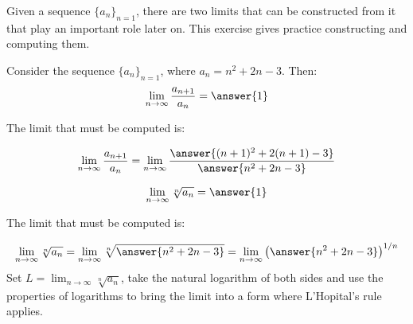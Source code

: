 \documentclass{ximera}
\author{Jim Talamo}
\begin{document}
\begin{exercise}

Given a sequence $\{a_n\}_{n=1}$, there are two limits that can be constructed from it that play an important role later on.  This exercise gives practice constructing and computing them.

Consider the sequence $\{a_n \}_{n=1}$, where $a_n =n^2+2n-3$.  Then:
\[
\lim_{n \to \infty} \frac{a_{n+1}}{a_n} = \answer{1}
\]

\begin{hint}
The limit that must be computed is:

\[
\lim_{n \to \infty} \frac{a_{n+1}}{a_n} = \lim_{n \to \infty} \frac{\answer{(n+1)^2+2(n+1)-3}}{\answer{n^2+2n-3}}
\]

\end{hint}

\[
\lim_{n \to \infty} \sqrt[n]{a_n} = \answer{1}
\]
\begin{hint}
The limit that must be computed is:

\[
\lim_{n \to \infty} \sqrt[n]{a_n} = \lim_{n \to \infty} \sqrt[n]{\answer{n^2+2n-3}} =  \lim_{n \to \infty} \left(\answer{n^2+2n-3}\right)^{1/n}
\]
Set $L = \lim_{n \to \infty} \sqrt[n]{a_n}$, take the natural logarithm of both sides and use the properties of logarithms to bring the limit into a form where L'Hopital's rule applies.
\end{hint}
\end{exercise}
\end{document}
